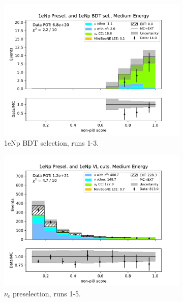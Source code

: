 \begin{figure}[H]
    \begin{subfigure}{0.33\linewidth}
        \includegraphics[width=\linewidth]{technote/Sidebands/Figures/NearSideband/near_sideband_nonpi0_score_run123_NP_NPBDT_MEDIUM_ENERGY.pdf}
        \caption{1eNp BDT selection, runs 1-3.}
    \end{subfigure}
    \begin{subfigure}{0.33\linewidth}
        \includegraphics[width=\linewidth]{technote/Sidebands/Figures/NearSideband/near_sideband_nonpi0_score_run1234a4b4c4d5_NP_NP_MEDIUM_ENERGY.pdf}
        \caption{$\nu_e$ preselection, runs 1-5.}
    \end{subfigure}%
    \begin{subfigure}{0.33\linewidth}

\end{subfigure}
\end{figure}

